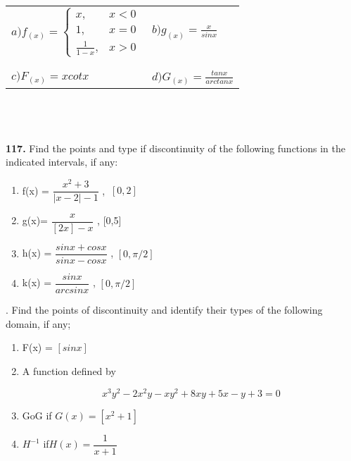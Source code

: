 \documentclass[11pt]{amsbook}
\begin{document}
\begin{tabular}{ll}
$a)  f_{(x)} = \left\{ 
\begin{array}{ll}
x, & x<0\\
1, & x=0 \\
\frac{1}{1-x}, & x>0
\end{array} 
\right.$
&
$b) g_{(x)}=\frac{x}{sin x}$\\\\\\

$c) F_{(x)}=x cot x$
&
$d) G_{(x)}=\frac{tan x}{arctan x}$
\end{tabular}
\\\\\\
\textbf{117.} Find the points and type if discontinuity of the following functions in the indicated intervals, if any:\\
\begin{enumerate}
\renewcommand{\labelenumi}{\alph{enumi})}

\item f(x) = $\dfrac{x^2+3}{|x-2|-1}$ , $\> [0,2]$

\item g(x)= $\dfrac{x}{[2x]-x}$ , [0,5]

\item h(x) = $\dfrac{sinx+cosx}{sinx-cosx}$ , $[0,\pi/2]$

\item k(x) = $\dfrac{sinx}{arcsinx}$ , $[0,\pi/2]$\\

\end {enumerate}

. Find the points of discontinuity  and identify their types of the following domain, if any;

\begin{enumerate}
\renewcommand{\labelenumi}{\alph{enumi})}

\item F(x) = $[sinx]$

\item A function defined by

\begin{equation*}
x^3y^2-2x^2y-xy^2+8xy+5x-y+3=0
\end{equation*}

\item GoG if $G(x)= [x^2+1] $

\item $H^{-1}$  if$ H(x) = \dfrac{1}{x+1}$\\

\end {enumerate}
\end{document}
